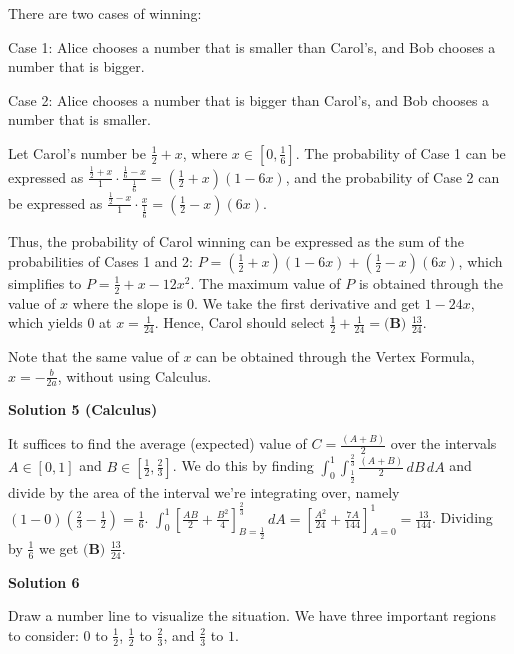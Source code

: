 \begin{enumerate}
 There are two cases of winning: 

 Case 1: Alice chooses a number that is smaller than Carol's, and Bob chooses a number that is bigger. 

 Case 2: Alice chooses a number that is bigger than Carol's, and Bob chooses a number that is smaller.

 Let Carol's number be $\frac{1}{2}+x$, where $x \in \left[0, \frac{1}{6}\right]$. The probability of Case 1 can be expressed as $\frac{\frac{1}{2} + x}{1}\cdot\frac{\frac{1}{6} - x}{\frac{1}{6}}=\left(\frac{1}{2} + x\right)\left(1 - 6x\right)$, and the probability of Case 2 can be expressed as $\frac{\frac{1}{2} - x}{1}\cdot\frac{x}{\frac{1}{6}}=\left(\frac{1}{2} - x\right)\left(6x\right)$. 

 Thus, the probability of Carol winning can be expressed as the sum of the probabilities of Cases 1 and 2: $P = \left(\frac{1}{2} + x\right)\left(1 - 6x\right) + \left(\frac{1}{2} - x\right)\left(6x\right)$, which simplifies to $P = \frac{1}{2} + x - 12x^2$. The maximum value of $P$ is obtained through the value of $x$ where the slope is $0$. We take the first derivative and get $1 - 24x$, which yields $0$ at $x = \frac{1}{24}$. Hence, Carol should select $\frac{1}{2} + \frac{1}{24} = \boxed{\textbf{(B) }\frac{13}{24}}$.

 Note that the same value of $x$ can be obtained through the Vertex Formula, $x=-\frac{b}{2a}$, without using Calculus.

 



\textbf{Solution 5 (Calculus)}

It suffices to find the average (expected) value of $C=\frac{\left(A+B\right)}{2}$ over the intervals $A \in \left[0,1\right]$ and $B \in \left[\frac{1}{2},\frac{2}{3}\right]$. We do this by finding $\int_0^1 \int_\frac{1}{2}^\frac{2}{3}\frac{\left(A+B\right)}{2}\,dB\,dA$ and divide by the area of the interval we're integrating over, namely ${\left(1-0\right)\left(\frac{2}{3}-\frac{1}{2}\right)}=\frac{1}{6}$. $\int_0^1 \left[\frac{AB}{2}+\frac{B^2}{4}\right]_{B=\frac{1}{2}}^\frac{2}{3}\,dA = \left[\frac{A^2}{24}+\frac{7A}{144}\right]_{A=0}^1=\frac{13}{144}$. Dividing by $\frac{1}{6}$ we get $\boxed{\textbf{(B) }\frac{13}{24}}$.

 



\textbf{Solution 6}

Draw a number line to visualize the situation. We have three important regions to consider: $0$ to $\frac{1}{2}$,  $\frac{1}{2}$ to $\frac{2}{3}$,  and  $\frac{2}{3}$ to $1$.


\end{enumerate}
